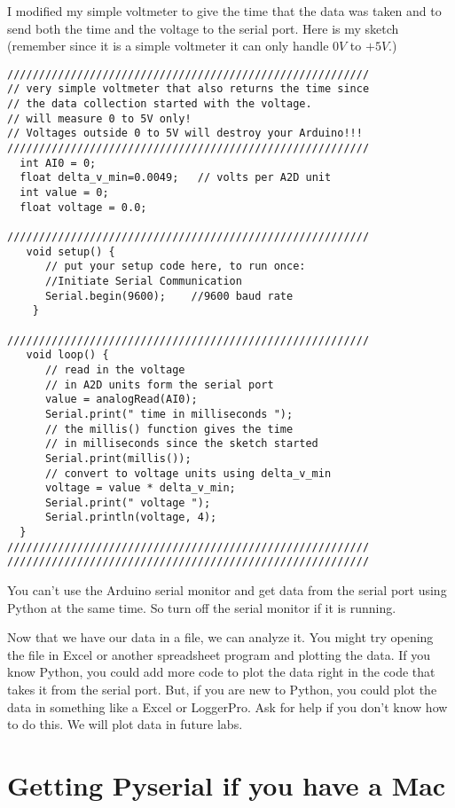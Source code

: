 I modified my simple voltmeter to give the time that the data was taken and
to send both the time and the voltage to the serial port. Here is my sketch
(remember since it is a simple voltmeter it can only handle $0\unit{V}$ to $%
+5\unit{V}.$)

\begin{lstlisting}[language=Arduino]
/////////////////////////////////////////////////////////
// very simple voltmeter that also returns the time since 
// the data collection started with the voltage.
// will measure 0 to 5V only!
// Voltages outside 0 to 5V will destroy your Arduino!!!
/////////////////////////////////////////////////////////
  int AI0 = 0;
  float delta_v_min=0.0049;   // volts per A2D unit
  int value = 0;
  float voltage = 0.0;
 
/////////////////////////////////////////////////////////
   void setup() {
      // put your setup code here, to run once:
      //Initiate Serial Communication
      Serial.begin(9600);    //9600 baud rate
    }
    
/////////////////////////////////////////////////////////
   void loop() {
      // read in the voltage 
      // in A2D units form the serial port
      value = analogRead(AI0); 
      Serial.print(" time in milliseconds ");
      // the millis() function gives the time 
      // in milliseconds since the sketch started
      Serial.print(millis()); 
      // convert to voltage units using delta_v_min
      voltage = value * delta_v_min;
      Serial.print(" voltage ");
      Serial.println(voltage, 4);  
  }
/////////////////////////////////////////////////////////
/////////////////////////////////////////////////////////
\end{lstlisting}

You can't use the Arduino serial monitor and get data from the serial port
using Python at the same time. So turn off the serial monitor if it is
running.

Now that we have our data in a file, we can analyze it. You might try
opening the file in Excel or another spreadsheet program and plotting the
data. If you know Python, you could add more code to plot the data right in
the code that takes it from the serial port. But, if you are new to Python,
you could plot the data in something like a Excel or LoggerPro. Ask for help
if you don't know how to do this. We will plot data in future labs.

\section{Getting Pyserial if you have a Mac}

